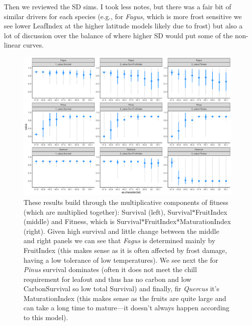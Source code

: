 \documentclass[11pt,letter]{article}
\begin{document}
Then we reviewed the SD sims. I took less notes, but there was a fair bit of similar drivers for each species (e.g., for \emph{Fagus}, which is more frost sensitive we see lower LeafIndex at the higher latitude models likely due to frost) but also a lot of discussion over the balance of where higher SD would put some of the non-linear curves. 

\begin{figure} 
 \begin{center}
\noindent \includegraphics[width=1\textwidth]{..//analyses/graphs/phenofit/historical/fitnessBuildup.pdf}
  \caption{These results build through the multiplicative components of fitness (which are multiplied together): Survival (left), Survival$*$FruitIndex (middle) and Fitness, which is Survival$*$FruitIndex*MaturationIndex (right). Given high survival and little change between the middle and right panels we can see that \emph{Fagus} is determined mainly by FruitIndex (this makes sense as it is often affected by frost damage, having a low tolerance of low temperatures). We see next the for \emph{Pinus} survival dominates (often it does not meet the chill requirement for leafout and thus has no carbon and low CarbonSurvival so low total Survival) and finally, fir \emph{Quercus} it's MaturationIndex (this makes sense as the fruits are quite large and can take a long time to mature---it doesn't always happen according to this model). }
  \label{fig:historicalfitnessl}
  \end{center}
\end{figure}
\end{document}
